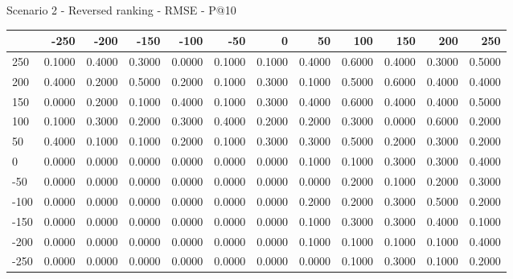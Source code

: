 Scenario 2 - Reversed ranking - RMSE - P@10
\begin{tabular}{lrrrrrrrrrrr}
\toprule
{} &   -250 &   -200 &   -150 &   -100 &   -50  &    0   &    50  &    100 &    150 &    200 &    250 \\
\midrule
 250 & 0.1000 & 0.4000 & 0.3000 & 0.0000 & 0.1000 & 0.1000 & 0.4000 & 0.6000 & 0.4000 & 0.3000 & 0.5000 \\
 200 & 0.4000 & 0.2000 & 0.5000 & 0.2000 & 0.1000 & 0.3000 & 0.1000 & 0.5000 & 0.6000 & 0.4000 & 0.4000 \\
 150 & 0.0000 & 0.2000 & 0.1000 & 0.4000 & 0.1000 & 0.3000 & 0.4000 & 0.6000 & 0.4000 & 0.4000 & 0.5000 \\
 100 & 0.1000 & 0.3000 & 0.2000 & 0.3000 & 0.4000 & 0.2000 & 0.2000 & 0.3000 & 0.0000 & 0.6000 & 0.2000 \\
 50  & 0.4000 & 0.1000 & 0.1000 & 0.2000 & 0.1000 & 0.3000 & 0.3000 & 0.5000 & 0.2000 & 0.3000 & 0.2000 \\
 0   & 0.0000 & 0.0000 & 0.0000 & 0.0000 & 0.0000 & 0.0000 & 0.1000 & 0.1000 & 0.3000 & 0.3000 & 0.4000 \\
-50  & 0.0000 & 0.0000 & 0.0000 & 0.0000 & 0.0000 & 0.0000 & 0.0000 & 0.2000 & 0.1000 & 0.2000 & 0.3000 \\
-100 & 0.0000 & 0.0000 & 0.0000 & 0.0000 & 0.0000 & 0.0000 & 0.2000 & 0.2000 & 0.3000 & 0.5000 & 0.2000 \\
-150 & 0.0000 & 0.0000 & 0.0000 & 0.0000 & 0.0000 & 0.0000 & 0.1000 & 0.3000 & 0.3000 & 0.4000 & 0.1000 \\
-200 & 0.0000 & 0.0000 & 0.0000 & 0.0000 & 0.0000 & 0.0000 & 0.1000 & 0.1000 & 0.1000 & 0.1000 & 0.4000 \\
-250 & 0.0000 & 0.0000 & 0.0000 & 0.0000 & 0.0000 & 0.0000 & 0.0000 & 0.1000 & 0.3000 & 0.1000 & 0.2000 \\
\bottomrule
\end{tabular}

